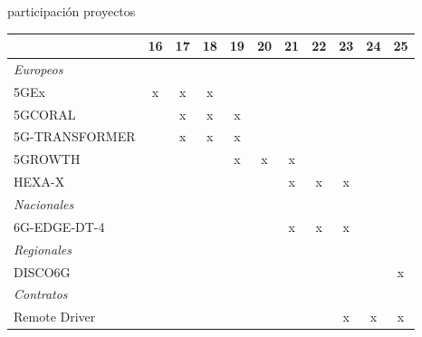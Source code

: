 \documentclass[xcolor=table,xcolor=x11names]{beamer}
\begin{document}
\begin{frame}{\secname}{participación proyectos}
    \begin{table}
        \small
    \begin{tabular}{l | c c c c c c c c c c}
        \toprule
        & 16 & 17 & 18 & 19 & 20 & 21 & 22 & 23 & 24 & 25\\ \midrule
        \rowcolor{upmblue!20}\emph{Europeos} & & & & & & & & & &\\
        5GEx & x & x & x & & & & & & &\\
        5GCORAL &   & x & x & x & & & & & &\\
        5G-TRANSFORMER &   & x & x & x & & & & & &\\
        5GROWTH &   &   &   & x & x & x & & & &\\
        HEXA-X  &   &   &   &   &   & x & x & x & &\\ \midrule
        \rowcolor{upmblue!20}\emph{Nacionales} & & & & & & & & & &\\
        6G-EDGE-DT-4  &   &   &   &   &   & x & x & x & &\\ \midrule
        \rowcolor{upmblue!20}\emph{Regionales} & & & & & & & & & &\\
        DISCO6G  &   &   &   &   &   &   &   &   &   & x \\ \midrule
        \rowcolor{upmblue!20}\emph{Contratos} & & & & & & & & & &\\
        Remote Driver &   &   &   &   &   &   &   & x & x & x \\ \bottomrule
    \end{tabular}
    \end{table}
\end{frame}
\end{document}
